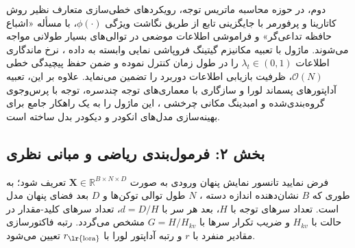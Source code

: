 دوم، در حوزه محاسبه ماتریس توجه، رویکردهای خطی‌سازی متعارف نظیر روش کاتارینا و پرفورمر  با جایگزینی تابع  از طریق نگاشت ویژگی $\phi(\cdot)$، با مسأله «اشباع حافظه تداعی‌گر»  و فراموشی اطلاعات موضعی در توالی‌های بسیار طولانی مواجه می‌شوند. ماژول  با تعبیه مکانیزم گیتینگ فروپاشی نمایی وابسته به داده ، نرخ ماندگاری اطلاعات $\lambda_t \in (0, 1)$ را در طول زمان کنترل نموده و ضمن حفظ پیچیدگی خطی $\mathcal{O}(N)$، ظرفیت بازیابی اطلاعات دوربرد را تضمین می‌نماید. علاوه بر این، تعبیه آداپتورهای پسماند لورا  و سازگاری با معماری‌های توجه چندسره، توجه با پرس‌وجوی گروه‌بندی‌شده  و امبدینگ مکانی چرخشی ، این ماژول را به یک راهکار جامع برای بهینه‌سازی مدل‌های انکودر و دیکودر بدل ساخته است.

\subsection*{بخش ۲: فرمول‌بندی ریاضی و مبانی نظری }

فرض نمایید تانسور نمایش پنهان ورودی به صورت $\mathbf{X} \in \mathbb{R}^{B \times N \times D}$ تعریف شود؛ به طوری که $B$ نشان‌دهنده اندازه دسته ، $N$ طول توالی توکن‌ها  و $D$ بعد فضای پنهان مدل  است. تعداد سرهای توجه با $H$، بعد هر سر با $d = D/H$، تعداد سرهای کلید-مقدار در حالت  با $H_{kv}$ و ضریب تکرار سرها با $G = H / H_{kv}$ مشخص می‌گردد. رتبه فاکتورسازی مقادیر منفرد با $r$ و رتبه آداپتور لورا با $r_{\text{\lr{lora}}}$ تعیین می‌شود.

